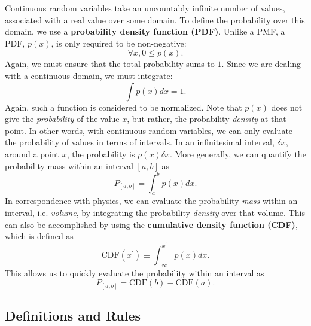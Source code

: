 Continuous random variables take an uncountably infinite number of values, associated with a real value over some domain. To define the probability over this domain, we use a \textbf{probability density function (PDF)}. Unlike a PMF, a PDF, $p(x)$, is only required to be non-negative:
$$ \forall x, 0 \leq p(x). $$
Again, we must ensure that the total probability sums to $1$. Since we are dealing with a continuous domain, we must integrate:
$$ \int p(x) dx = 1. $$
Again, such a function is considered to be normalized. Note that $p(x)$ does not give the \textit{probability} of the value $x$, but rather, the probability \textit{density} at that point. In other words, with continuous random variables, we can only evaluate the probability of values in terms of intervals. In an infinitesimal interval, $\delta x$, around a point $x$, the probability is $p(x) \delta x$. More generally, we can quantify the probability mass within an interval $[a, b]$ as
$$P_{[a,b]} = \int_a^b p(x) dx. $$
In correspondence with physics, we can evaluate the probability \textit{mass} within an interval, i.e. \textit{volume}, by integrating the probability \textit{density} over that volume. This can also be accomplished by using the \textbf{cumulative density function (CDF)}, which is defined as
$$ \textrm{CDF}(x^\prime) \equiv \int_{- \infty}^{x^\prime} p(x) dx. $$
This allows us to quickly evaluate the probability within an interval as
$$ P_{[a,b]} = \textrm{CDF}(b) - \textrm{CDF}(a). $$

\subsection{Definitions and Rules}

